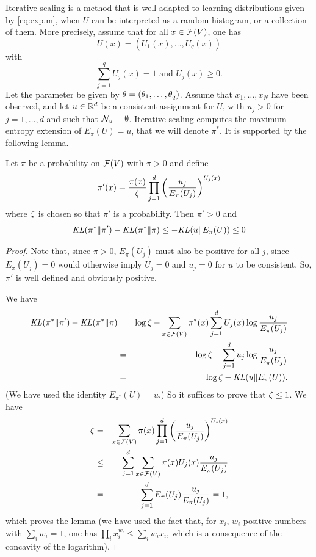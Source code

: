 Iterative scaling is a method that is well-adapted to learning
distributions given by \cref{eq:exp.m}, when $U$ can be interpreted
as a random histogram, or a collection of them. 
More precisely, assume that for all $x\in {\mathcal F}(V)$, one has 
\[
U(x) =
(U_1(x), \ldots, U_q(x))\]
 with 
\[
\sum_{j=1}^q U_j(x) = 1 \text{ and } U_j(x) \geq 0.
\]
Let the parameter be given by $\theta = (\theta_1, \ldots, \theta_q)$. Assume
that $x_1, \ldots, x_N$ have been observed, and let $u\in
{\mathbb{R}}^d$ be a consistent assignment for $U$, with $u_j>0$ for $j=1,
\ldots, d$ and such that ${\mathcal N}_u = \emptyset$. Iterative scaling computes the
maximum entropy extension of $E_\pi(U) = u$, that we will denote
$\pi^*$. It is supported by the
following lemma. 
\begin{lemma}
\label{lem:iter.sca}
Let $\pi$ be a probability on ${\mathcal F}(V)$ with $\pi >0$ and define
\[
\pi'(x) = \frac{\pi(x)}{\zeta} \prod_{j=1}^d \left(\frac{u_j}{E_\pi(
    U_j)}\right)^{U_j(x)}
\]
where $\zeta$ is chosen so that $\pi'$ is a probability. Then $\pi' > 0$ and
\begin{equation}
\mathit{KL}(\pi^*\|\pi') - \mathit{KL}(\pi^*\|\pi) \leq -\mathit{KL}(u\|E_\pi(U))\leq 0
\label{eq:lem.iter.sca}
\end{equation}
\end{lemma}
\begin{proof}
Note that, since $\pi >0$,  $E_\pi(U_j)$ must also be positive for all
$j$, since $E_\pi(U_j) = 0$ would otherwise imply $U_j=0$ and $u_j =
0$ for $u$ to be consistent. So, $\pi'$ is well defined and obviously
positive.

We have
\begin{eqnarray*}
\mathit{KL}(\pi^*\|\pi') - \mathit{KL}(\pi^*\|\pi) &=& \log\zeta - \sum_{x\in {\mathcal F}(V)}
\pi^*(x) \sum_{j=1}^d U_j(x) \log \frac{u_j}{E_\pi(
    U_j)} \\
&=&  \log\zeta - \sum_{j=1}^d u_j \log \frac{u_j}{E_\pi(
    U_j)} \\
&=& \log\zeta -  \mathit{KL}(u\|E_\pi(U)).
\end{eqnarray*}
(We have used the identity $E_{\pi^*}(U) = u$.)
So it suffices to prove that $\zeta \leq 1$. We have
\begin{eqnarray*}
\zeta &=& \sum_{x\in {\mathcal F}(V)} \pi(x) \prod_{j=1}^d \left(\frac{u_j}{E_\pi(
    U_j)}\right)^{U_j(x)} \\
&\leq & \sum_{j=1}^d \sum_{x\in{\mathcal F}(V)} \pi(x) U_j(x) \frac{u_j}{E_\pi (U_{j})}\\
&= & \sum_{j=1}^d E_\pi(U_{j}) \frac{u_j}{E_\pi(U_j)} = 1,
\end{eqnarray*}
which proves the lemma (we have used the fact that, for $x_i$, $w_i$ positive numbers with $\sum_i w_i=1$, one has $\prod_i x_i^{w_i} \leq \sum_i w_i x_i$, which is a consequence of the concavity of the logarithm).
\end{proof}


